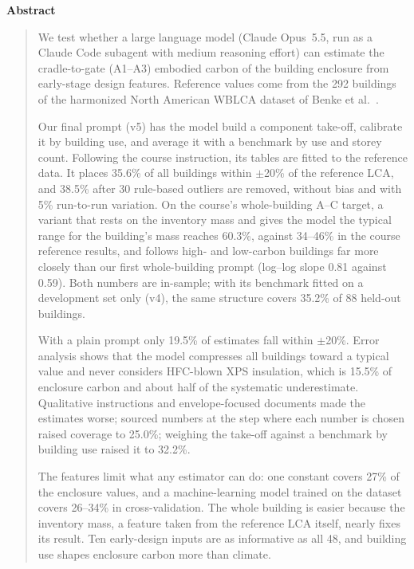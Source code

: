 \documentclass[10pt,letterpaper]{article}
\begin{document}
\begin{center}\textbf{\large Abstract}\end{center}
\vspace{-4pt}
\begin{quote}\small
We test whether a large language model (Claude Opus~5.5, run as a Claude Code subagent with medium reasoning effort) can estimate the cradle-to-gate (A1--A3) embodied carbon of the building enclosure from early-stage design features. Reference values come from the 292 buildings of the harmonized North American WBLCA dataset of Benke et al.~\cite{benke2025}.

Our final prompt (v5) has the model build a component take-off, calibrate it by building use, and average it with a benchmark by use and storey count. Following the course instruction, its tables are fitted to the reference data. It places 35.6\% of all buildings within $\pm$20\% of the reference LCA, and 38.5\% after 30 rule-based outliers are removed, without bias and with 5\% run-to-run variation. On the course's whole-building A--C target, a variant that rests on the inventory mass and gives the model the typical range for the building's mass reaches 60.3\%, against 34--46\% in the course reference results, and follows high- and low-carbon buildings far more closely than our first whole-building prompt (log--log slope 0.81 against 0.59). Both numbers are in-sample; with its benchmark fitted on a development set only (v4), the same structure covers 35.2\% of 88 held-out buildings.

With a plain prompt only 19.5\% of estimates fall within $\pm$20\%. Error analysis shows that the model compresses all buildings toward a typical value and never considers HFC-blown XPS insulation, which is 15.5\% of enclosure carbon and about half of the systematic underestimate. Qualitative instructions and envelope-focused documents made the estimates worse; sourced numbers at the step where each number is chosen raised coverage to 25.0\%; weighing the take-off against a benchmark by building use raised it to 32.2\%.

The features limit what any estimator can do: one constant covers 27\% of the enclosure values, and a machine-learning model trained on the dataset covers 26--34\% in cross-validation. The whole building is easier because the inventory mass, a feature taken from the reference LCA itself, nearly fixes its result. Ten early-design inputs are as informative as all 48, and building use shapes enclosure carbon more than climate.
\end{quote}
\end{document}
